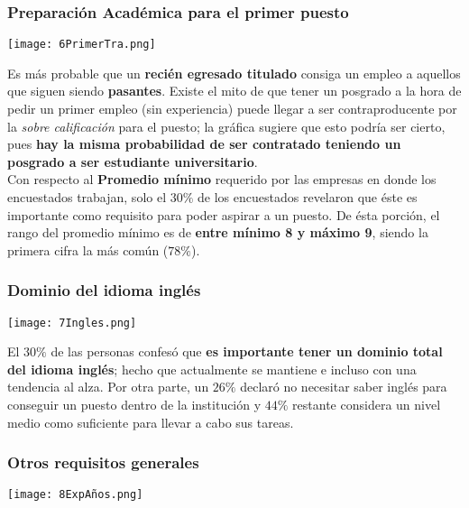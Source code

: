 \documentclass{article}
\begin{document}
\subsubsection{Preparación Académica para el primer puesto}

\begin{center}
    \texttt{[image: 6PrimerTra.png]}
\end{center}

Es más probable que un \textbf{recién egresado titulado} consiga un empleo a aquellos que siguen siendo \textbf{pasantes}. Existe el mito de que tener un posgrado a la hora de pedir un primer empleo (sin experiencia) puede llegar a ser contraproducente por la \textit{sobre calificación} para el puesto; la gráfica sugiere que esto podría ser cierto, pues \textbf{hay la misma probabilidad de ser contratado teniendo un posgrado a ser estudiante universitario}. \\

Con respecto al \textbf{Promedio mínimo} requerido por las empresas en donde los encuestados trabajan, solo el $30\%$ de los encuestados revelaron que éste es importante como requisito para poder aspirar a un puesto. De ésta porción, el rango del promedio mínimo es de \textbf{entre mínimo 8 y máximo 9}, siendo la primera cifra la más común ($78\%$).

\subsubsection{Dominio del idioma inglés}

\begin{center}
    \texttt{[image: 7Ingles.png]}
\end{center}

El $30\%$ de las personas confesó que \textbf{es importante tener un dominio total del idioma inglés}; hecho que actualmente se mantiene e incluso con una tendencia al alza. Por otra parte, un $26\%$ declaró no necesitar saber inglés para conseguir un puesto dentro de la institución y $44\%$ restante considera un nivel medio como suficiente para llevar a cabo sus tareas.  

\subsubsection{Otros requisitos generales}

\begin{center}
    \texttt{[image: 8ExpAños.png]}
\end{center}
\end{document}
